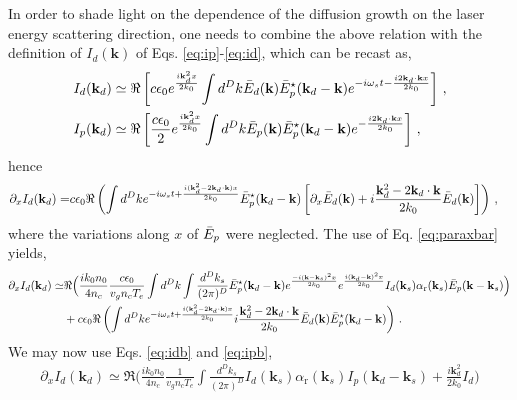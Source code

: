 \documentclass[
 reprint,
 amsmath,amssymb,
 aps,
]{revtex4-1}
\begin{document}
\begin{widetext}
In order to shade light on the dependence of the diffusion growth on the laser energy scattering direction, one needs to combine the above relation with the definition of $I_d(\mathbf{k})$ of  Eqs. \eqref{eq:ip}-\eqref{eq:id}, which can be recast as,
\begin{align}
I_d(\mathbf{k}_d) &\simeq  \Re\left[  c\epsilon_0e^{\frac{ i\mathbf{k}_d^2x}{2k_0}}  \int d^Dk \Bar{E}_d(\mathbf{k}) \Bar{E}_p^\star(\mathbf{k}_d-\mathbf{k})e^{-i\omega_s t -\frac{i2\mathbf{k}_d\cdot \mathbf{k}x}{2k_0}}\right]  \, , \label{eq:idb} \\
I_p(\mathbf{k}_d) &\simeq  \Re\left[  \frac{c\epsilon_0}{2}e^{\frac{ i\mathbf{k}_d^2x}{2k_0}}  \int d^Dk \Bar{E}_p(\mathbf{k}) \Bar{E}_p^\star(\mathbf{k}_d-\mathbf{k})e^{ -\frac{i2\mathbf{k}_d\cdot \mathbf{k}x}{2k_0}}\right]  \, , \label{eq:ipb}
\end{align}
hence
\begin{align}
\partial_xI_d(\mathbf{k}_d)=  &  c\epsilon_0  \Re\left( \int d^Dk e^{-i\omega_st+ \frac{i( \mathbf{k}_d^2-2\mathbf{k}_d\cdot \mathbf{k} )x}{2k_0}} \Bar{E}_p^\star(\mathbf{k}_d-\mathbf{k} )
\left[\partial_x \Bar{E}_d (\mathbf{k}  ) 
+i\frac{  \mathbf{k}_d^2-2\mathbf{k}_d\cdot \mathbf{k}}{2k_0} \Bar{E}_d(\mathbf{k})
\right]  \right)\, , \label{eq:idbdz}
\end{align}
where the variations along $x$ of $\Bar{E}_p$ were neglected. 
The  use of Eq. \eqref{eq:paraxbar} yields, 
\begin{align}
\partial_xI_d(\mathbf{k}_d)\simeq &\Re\Big( \frac{ik_0n_0}{4n_c} \frac{c\epsilon_0 }{  v_g n_c T_e}   \int d^Dk \int \frac{d^Dk_s}{(2\pi)^D} \Bar{E}_p^\star(\mathbf{k}_d-\mathbf{k})
e^{\frac{-i(\mathbf{k}-\mathbf{k}_s)^2x}{2k_0} }
e^{\frac{i(\mathbf{k}_d-\mathbf{k})^2x}{2k_0} }
I_d(\mathbf{k}_s) \alpha_\mathrm{r}(\mathbf{k}_s) 
\Bar{E}_p(\mathbf{k}-\mathbf{k}_s) 
 \Big) \nonumber\\
& +c\epsilon_0  \Re\left( \int d^Dk e^{-i\omega_s t+\frac{ i( \mathbf{k}_d^2-2\mathbf{k}_d\cdot \mathbf{k} )x}{2k_0}} 
i\frac{  \mathbf{k}_d^2-2\mathbf{k}_d\cdot \mathbf{k}}{2k_0} \Bar{E}_d(\mathbf{k})\Bar{E}_p^\star(\mathbf{k}_d-\mathbf{k} )
  \right)
\, . \label{eq:g1}
\end{align}
We may now use Eqs. \eqref{eq:idb} and  \eqref{eq:ipb}, 
\begin{align}
\partial_xI_d(\mathbf{k}_d)\simeq \Re\Big( \frac{ik_0n_0}{4n_c} \frac{1 }{  v_g n_c T_e}    \int \frac{d^Dk_s}{(2\pi)^D} I_d(\mathbf{k}_s) \alpha_\mathrm{r}(\mathbf{k}_s)
I_p(\mathbf{k}_d-\mathbf{k}_s)
+\frac{i\mathbf{k}_d^2}{2k_0} I_d \Big) 

\end{align}
\end{widetext}
\end{document}
